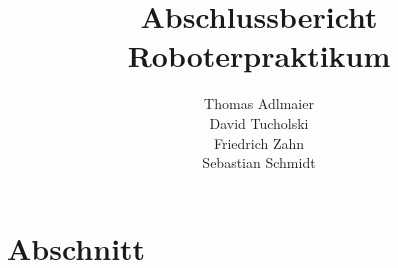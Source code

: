 \documentclass[a4paper, 12pt]{scrreprt}
\title{Abschlussbericht Roboterpraktikum}
\author{Thomas Adlmaier\\ David Tucholski\\ Friedrich Zahn\\ Sebastian Schmidt}
\begin{document}
\maketitle
\tableofcontents

\chapter{Abschnitt}
\lipsum
\end{document}
